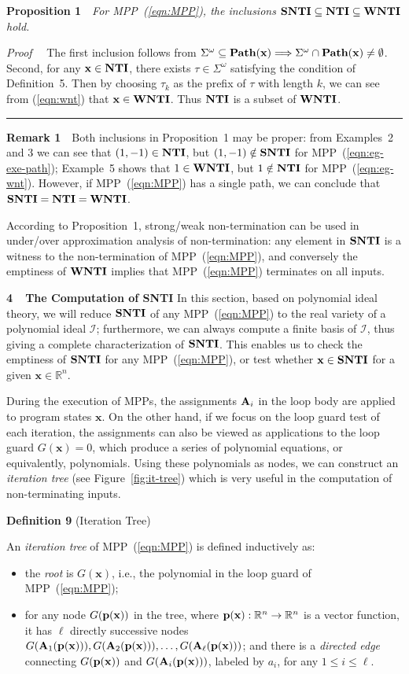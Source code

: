 \documentclass{article}
\def\dse#1{\vskip 0.6cm\noindent
        {\large\bf #1}
        \vskip 0.4cm}
\def\dsee#1{\vskip 0.3cm \noindent{\bf #1} \vskip 0.2cm}
\newcommand{\rulex}{\hfill\rule{1mm}{3mm}}
\newcommand{\I}{\mathcal{I}}
\newcommand{\xx}{\mathbf{x}}
\newcommand{\NTI}{{\bf NTI}}
\newcommand{\SNTI}{{\bf SNTI}}
\newcommand{\WNTI}{{\bf WNTI}}
\begin{document}
{\bf Proposition 1}~~{\it For MPP~(\ref{eqn:MPP}), the inclusions $\SNTI \subseteq \NTI \subseteq \WNTI$ hold.}

{\it Proof}~~ The first inclusion follows from $\Sigma^{\omega} \subseteq {\bf Path}(\xx) \Longrightarrow \Sigma^{\omega} \cap {\bf Path}(\xx) \neq \emptyset$. Second, for any $\xx \in \NTI$, there exists $\tau \in \Sigma^{\omega}$ satisfying the condition of Definition~5. Then by choosing $\tau_k$ as the prefix of $\tau$ with length $k$, we can see from (\ref{eqn:wnt}) that $\xx \in \WNTI$. Thus $\NTI$ is a subset of $\WNTI$. \rulex

{\bf Remark 1}~~{Both inclusions in Proposition~1 may be proper: from Examples~2 and 3 we can see that $(1,-1) \in \NTI$, but $(1,-1) \notin \SNTI$ for MPP~(\ref{eqn:eg-exe-path}); Example~5 shows that $1 \in \WNTI$, but $1 \notin \NTI$ for MPP~(\ref{eqn:eg-wnt}). However, if MPP~(\ref{eqn:MPP}) has a single path, we can conclude that $\SNTI=\NTI=\WNTI$.
}

According to Proposition~1, strong/weak non-termination can be used in under/over approximation analysis of non-termination: any element in $\SNTI$ is a witness to the non-termination of MPP~(\ref{eqn:MPP}), and conversely the emptiness of $\WNTI$ implies that MPP~(\ref{eqn:MPP}) terminates on all inputs.

\dse{4~~The Computation of SNTI}
In this section, based on polynomial ideal theory, we will reduce $\SNTI$ of any MPP~(\ref{eqn:MPP}) to the real variety of a polynomial ideal $\I$; furthermore, we can always compute a finite basis of $\I$, thus giving a complete characterization of $\SNTI$. This enables us to check the emptiness of $\SNTI$ for any MPP~(\ref{eqn:MPP}), or test whether $\xx \in \SNTI$ for a given $\xx \in \mathbb{R}^n$.

\dsee{4.1~~Iteration Trees}
During the execution of MPPs, the assignments ${\bf A}_i$ in the loop body are applied to program states $\xx$. On the other hand, if we focus on the loop guard test of each iteration, the assignments can also be viewed as applications to the loop guard $G(\xx)=0$, which produce a series of polynomial equations, or equivalently, polynomials. Using these polynomials as nodes, we can construct an \emph{iteration tree} (see Figure~\ref{fig:it-tree}) which is very useful in the computation of non-terminating inputs.

{\bf Definition 9} (Iteration Tree)~~{An \emph{iteration tree} of MPP~(\ref{eqn:MPP}) is defined inductively as:
\begin{itemize}
\item the \emph{root} is $G(\xx)$, i.e., the polynomial in the loop guard of MPP~(\ref{eqn:MPP});
\item for any node $G({\bf p}(\xx))$ in the tree, where ${\bf p}(\xx): \mathbb{R}^n \rightarrow \mathbb{R}^n$ is a vector function, it has $\ell$ directly successive nodes $G({\bf A}_1({\bf p}(\xx))),G({\bf A}_2({\bf p}(\xx))),\ldots,G({\bf A}_{\ell} ({\bf p}(\xx)))$; and there is a \emph{directed edge} connecting $G({\bf p}(\xx))$ and $G({\bf A}_i ({\bf p}(\xx)))$, labeled by $a_i$, for any $1 \leq i \leq \ell$.
\end{itemize}}
\end{document}
